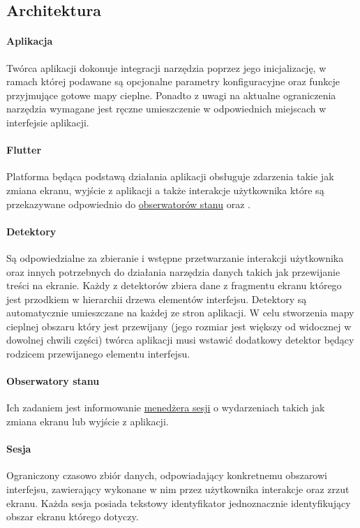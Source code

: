 \subsection{Architektura}

\paragraph{Aplikacja}
Twórca aplikacji dokonuje integracji narzędzia poprzez jego inicjalizację, w ramach której podawane są  opcjonalne parametry konfiguracyjne oraz funkcje przyjmujące gotowe mapy cieplne. Ponadto z uwagi na aktualne ograniczenia narzędzia wymagane jest ręczne umieszczenie \detector[ów] w odpowiednich miejscach w interfejsie aplikacji.

\paragraph{Flutter} Platforma będąca podstawą działania aplikacji obsługuje zdarzenia takie jak zmiana ekranu, wyjście z aplikacji a także interakcje użytkownika które są przekazywane odpowiednio do \hyperref[par:rs_observers]{obserwatorów stanu} oraz \detector[ów].

\paragraph{Detektory} 
\label{par:rs_detectors}
Są odpowiedzialne za zbieranie i wstępne przetwarzanie interakcji użytkownika oraz innych potrzebnych do działania narzędzia danych takich jak przewijanie treści na ekranie. Każdy z detektorów zbiera dane z fragmentu ekranu którego jest przodkiem w hierarchii drzewa elementów interfejsu. Detektory są automatycznie umieszczane na każdej ze stron aplikacji. W celu stworzenia mapy cieplnej obszaru który jest przewijany (jego rozmiar jest większy od widocznej w dowolnej chwili części) twórca aplikacji musi wstawić dodatkowy detektor będący rodzicem przewijanego elementu interfejsu.

\paragraph{Obserwatory stanu} 
\label{par:rs_observers}
Ich zadaniem jest informowanie \hyperref[par:rs_session_manager]{menedżera sesji} o wydarzeniach takich jak zmiana ekranu lub wyjście z aplikacji.

\paragraph{Sesja}
\label{par:rs_session}
Ograniczony czasowo zbiór danych, odpowiadający konkretnemu obszarowi interfejsu, zawierający wykonane w nim przez użytkownika interakcje oraz zrzut ekranu. Każda sesja posiada tekstowy identyfikator jednoznacznie identyfikujący obszar ekranu którego dotyczy.

